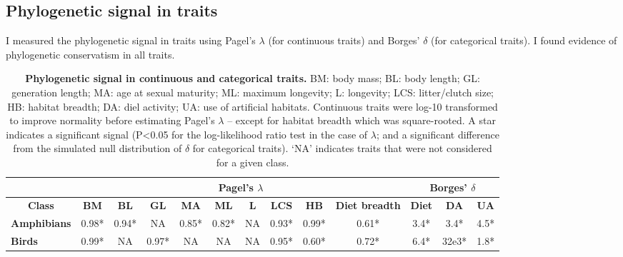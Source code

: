 \subsection{Phylogenetic signal in traits}
I measured the phylogenetic signal in traits using Pagel's $\lambda$ (for continuous traits) and Borges' $\delta$ (for categorical traits). I found evidence of phylogenetic conservatism in all traits.

\begin{table}[h!]
\renewcommand{\baselinestretch}{1}
\renewcommand{\arraystretch}{1.2}
\begin{center}\fontsize{9}{11}\selectfont
\caption[Phylogenetic signal in continuous and categorical traits]{\textbf{Phylogenetic signal in continuous and categorical traits.} BM: body mass; BL: body length; GL: generation length; MA: age at sexual maturity; ML: maximum longevity; L: longevity; LCS: litter/clutch size; HB: habitat breadth; DA: diel activity; UA: use of artificial habitats. Continuous traits were log-10 transformed to improve normality before estimating Pagel’s $\lambda$ – except for habitat breadth which was square-rooted. A star indicates a significant signal (P<0.05 for the log-likelihood ratio test in the case of $\lambda$; and a significant difference from the simulated null distribution of $\delta$ for categorical traits). ‘NA’ indicates traits that were not considered for a given class. %
}
\label{SI_4_Table1}  
\begin{tabular}{l|c|c|c|c|c|c|c|c|c|c|c|c|}
\cline{2-13}
                                          & \multicolumn{9}{c|}{\textbf{Pagel's $\lambda$}}                                                                       & \multicolumn{3}{c|}{\textbf{Borges' $\delta$}} \\ \hline
\multicolumn{1}{|c|}{\textbf{Class}}      & \textbf{BM} & \textbf{BL} & \textbf{GL} & \textbf{MA} & \textbf{ML} & \textbf{L} & \textbf{LCS} & \textbf{HB} & \textbf{Diet breadth} & \textbf{Diet} &  \textbf{DA} & \textbf{UA} \\ \hline
\multicolumn{1}{|l|}{\textbf{Amphibians}} & 0.98*       & 0.94*       & NA          & 0.85*       & 0.82*       & NA         & 0.93*        & 0.99*    & 0.61*  & 3.4*         &  3.4*        & 4.5*        \\ %
\multicolumn{1}{|l|}{\textbf{Birds}}      & 0.99*       & NA          & 0.97*       & NA          & NA          & NA         & 0.95*        & 0.60*   &  0.72*   & 6.4*         & 32e3*     & 1.8*        \\ %

\end{tabular}
\end{center}
\end{table}
